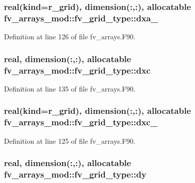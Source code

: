 \subsubsection[{dxa\-\_\-64}]{\setlength{\rightskip}{0pt plus 5cm}real(kind={\bf r\-\_\-grid}), dimension(\-:,\-:), allocatable fv\-\_\-arrays\-\_\-mod\-::fv\-\_\-grid\-\_\-type\-::dxa\-\_}\label{structfv__arrays__mod_1_1fv__grid__type_a187343458f867c17bc045e4ed26f3dcf}


Definition at line 126 of file fv\-\_\-arrays.\-F90.

\subsubsection[{dxc}]{\setlength{\rightskip}{0pt plus 5cm}real, dimension(\-:,\-:), allocatable fv\-\_\-arrays\-\_\-mod\-::fv\-\_\-grid\-\_\-type\-::dxc}\label{structfv__arrays__mod_1_1fv__grid__type_a7a4d21a6fe383c9dea04c5c739a3725f}


Definition at line 135 of file fv\-\_\-arrays.\-F90.

\subsubsection[{dxc\-\_\-64}]{\setlength{\rightskip}{0pt plus 5cm}real(kind={\bf r\-\_\-grid}), dimension(\-:,\-:), allocatable fv\-\_\-arrays\-\_\-mod\-::fv\-\_\-grid\-\_\-type\-::dxc\-\_}\label{structfv__arrays__mod_1_1fv__grid__type_a028087387fc0acb7ca9afdb9ffd7deb0}


Definition at line 125 of file fv\-\_\-arrays.\-F90.

\subsubsection[{dy}]{\setlength{\rightskip}{0pt plus 5cm}real, dimension(\-:,\-:), allocatable fv\-\_\-arrays\-\_\-mod\-::fv\-\_\-grid\-\_\-type\-::dy}\label{structfv__arrays__mod_1_1fv__grid__type_a2533f9a11ec2e1180249e7e2e3dd3048}


